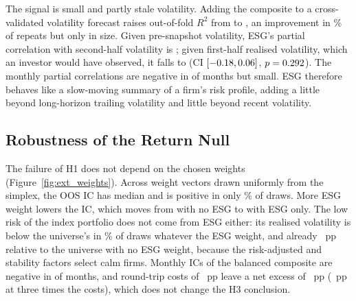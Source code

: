 The signal is small and partly stale volatility. Adding the composite to a
cross-validated volatility forecast raises out-of-fold $R^2$ from \CVBaseRSq
to \CVESGRSq, an improvement in \CVShareImproved\% of repeats but only
\CVDeltaESG in size. Given pre-snapshot volatility, ESG's partial
correlation with second-half volatility is \RecTrail; given first-half
realised volatility, which an investor would have observed, it falls to
\RecFirst (CI $[-0.18,0.06]$, $p=0.292$). The monthly
partial correlations are negative in \MonNegPartial of \NMonths months but
small. ESG therefore behaves like a slow-moving summary of a firm's risk
profile, adding a little beyond long-horizon trailing volatility and little
beyond recent volatility.

\begin{table}[t]
\centering
\caption{Rank-regression coefficients of each ESG measure for realised risk.
``Trailing'': control for the pre-snapshot value of the same risk measure;
``full'': all controls of Section~\ref{sec:ext_design}, with sector and
country fixed effects (HC3). Drawdown is signed, so a positive value means a
shallower drawdown. Bold: $p<0.05$ (two-sided, unadjusted). $N=\NOOS$.}
\label{tab:ext_controls}
\scriptsize
\setlength{\tabcolsep}{3pt}
\resizebox{\columnwidth}{!}{}
\end{table}

\begin{table}[t]
\centering
\caption{Robustness of the ESG--volatility result. Upper panel: H2 and H4 on
subsamples. Lower panel: partial Spearman correlation of ESG with realised
volatility after \SplitDate, given earlier volatility.}
\label{tab:ext_robust}
\scriptsize
\setlength{\tabcolsep}{2.5pt}
\resizebox{\columnwidth}{!}{}
\end{table}

\subsection{Robustness of the Return Null}
\label{sec:res_null}

The failure of H1 does not depend on the chosen weights
(Figure~\ref{fig:ext_weights}). Across \WDraws weight vectors drawn uniformly
from the simplex, the OOS IC has median \WICMedian and is positive in only
\WSharePos\% of draws. More ESG weight lowers the IC, which moves from
\SweepICZero with no ESG to \SweepICOne with ESG only. The low risk of the
index portfolio does not come from ESG either: its realised volatility is
below the universe's in \WShareLowVol\% of draws whatever the ESG weight, and
already \SweepVolZero~pp relative to the universe with no ESG weight, because
the risk-adjusted and stability factors select calm firms. Monthly ICs of the
balanced composite are negative in \MonNegICBal of \NMonths months, and
round-trip costs of \CostRT~pp leave a net excess of \NetExBase~pp
(\NetExStress~pp at three times the costs), which does not change the H3
conclusion.

